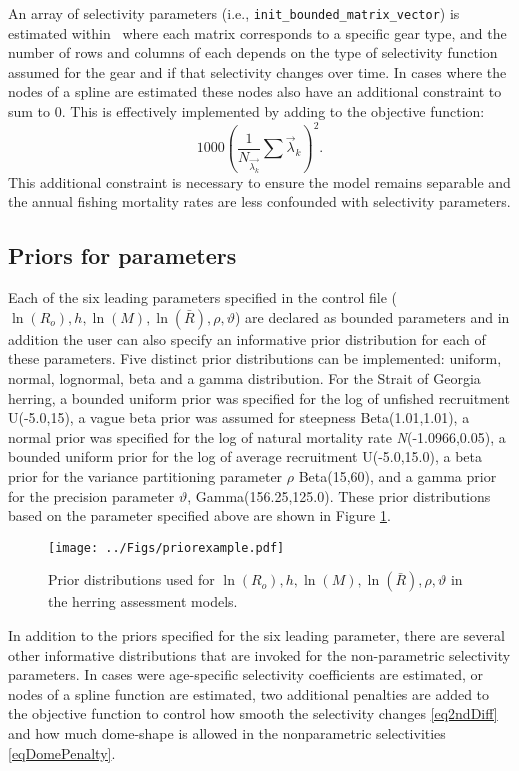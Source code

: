 An array of selectivity parameters (i.e., \verb"init_bounded_matrix_vector") is estimated within \iscam\, where each matrix corresponds to a specific gear type, and the number of rows and columns of each depends on the type of selectivity function assumed for the gear and if that selectivity changes over time.  In cases where the nodes of a spline are estimated these nodes also have an additional constraint to sum to 0.  This is effectively implemented by adding to the objective function: \[ 1000 \left(\frac{1}{N_{\vec{\lambda_k}}}\sum \vec{\lambda}_k \right)^2.\]  This additional constraint is necessary to ensure the model remains separable and the annual fishing mortality rates are less confounded with selectivity parameters.

\subsection{Priors for parameters}
	Each of the six leading parameters specified in the control file ($\ln(R_o),h,\ln(M),\ln(\bar{R}),\rho,\vartheta$) are declared as bounded parameters and in addition the user can also specify an informative prior distribution for each of these parameters.  Five distinct prior distributions can be implemented: uniform, normal, lognormal, beta and a gamma distribution.  For the Strait of Georgia herring, a bounded uniform prior was specified for  the log of unfished recruitment U(-5.0,15), a vague beta prior was assumed for steepness Beta(1.01,1.01), a normal prior was specified for the log of natural mortality rate \emph{N}(-1.0966,0.05), a bounded uniform prior for the log of average recruitment U(-5.0,15.0), a beta prior for the variance partitioning parameter $\rho$ Beta(15,60), and a gamma prior for the precision parameter $\vartheta$, Gamma(156.25,125.0). These prior distributions based on the parameter specified above are shown in Figure \ref{FigPriorExample}. 
	
\begin{figure}[!tbp]
	\centering
	\texttt{[image: ../Figs/priorexample.pdf]}\\
	\caption{Prior distributions used for $\ln(R_o),h,\ln(M),\ln(\bar{R}),\rho,\vartheta$ in the herring assessment models.}\label{FigPriorExample}
\end{figure}

In addition to the priors specified for the six leading parameter, there are several other informative distributions that are invoked for the non-parametric selectivity parameters.  In cases were age-specific selectivity coefficients are estimated, or nodes of a spline function are estimated, two additional penalties are added to the objective function to control how smooth the selectivity changes \eqref{eq2ndDiff} and how much dome-shape is allowed in the nonparametric selectivities \eqref{eqDomePenalty}.  

